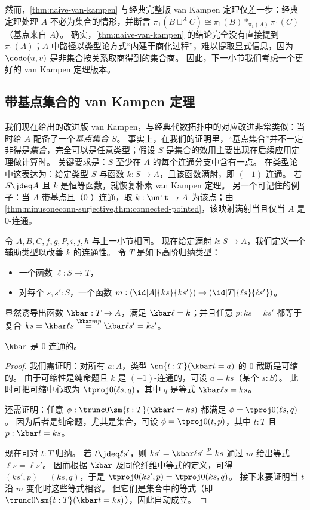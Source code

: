 %

然而，\cref{thm:naive-van-kampen} 与经典完整版 van Kampen 定理仅差一步：经典定理处理 $A$ 不必为集合的情形，并断言 $\pi_1(B\sqcup^A C) \cong \pi_1(B) *_{\pi_1(A)} \pi_1(C)$（基点来自 $A$）。
确实，\cref{thm:naive-van-kampen} 的结论完全没有直接提到 $\pi_1(A)$；$A$ 中路径以类型论方式“内建于商化过程”，难以提取显式信息，因为 $\code(u,v)$ 是非集合按关系取商得到的集合商。
因此，下一小节我们考虑一个更好的 van Kampen 定理版本。


\subsection{带基点集合的 van Kampen 定理}
\label{sec:better-vankampen}

%
我们现在给出的改进版 van Kampen，与经典代数拓扑中的对应改进非常类似：当时给 $A$ 配备了一个\emph{基点集合 $S$}。
事实上，在我们的证明里，“基点集合”并不一定非得是\emph{集合}，完全可以是任意类型；假设 $S$ 是集合的效用主要出现在后续应用定理做计算时。
关键要求是：$S$ 至少在 $A$ 的每个连通分支中含有一点。
在类型论中这表达为：给定类型 $S$ 与函数 $k:S \to A$，且该函数满射，即 $(-1)$-连通。
若 $S\jdeq A$ 且 $k$ 是恒等函数，就恢复朴素 van Kampen 定理。
另一个可记住的例子：当 $A$ 带基点且（0-）连通，取 $k:\unit\to A$ 为该点；由 \cref{thm:minusoneconn-surjective,thm:connected-pointed}，该映射满射当且仅当 $A$ 是 0-连通。

令 $A,B,C,f,g,P,i,j,h$ 与上一小节相同。
现在给定满射 $k:S\to A$，我们定义一个辅助类型以改善 $k$ 的连通性。
令 $T$ 是如下高阶归纳类型：
\begin{itemize}
\item 一个函数 $\ell:S\to T$，
\item 对每个 $s,s':S$，一个函数 $m:(\id[A]{ks}{ks'}) \to (\id[T]{\ell s}{\ell s'})$。
\end{itemize}
显然诱导出函数 $\kbar:T\to A$，满足 $\kbar \ell = k$；并且任意 $p:ks=ks'$ 都等于复合 $ks = \kbar \ell s \overset{\kbar m p}{=} \kbar \ell s' = k s'$。

\begin{lem}\label{thm:kbar}
  $\kbar$ 是 0-连通的。
\end{lem}
\begin{proof}
  我们需证明：对所有 $a:A$，类型 $\sm{t:T}(\kbar t = a)$ 的 0-截断是可缩的。
  由于可缩性是纯命题且 $k$ 是 $(-1)$-连通的，可设 $a=ks$（某个 $s:S$）。
  此时可把可缩中心取为 $\tproj0{(\ell s,q)}$，其中 $q$ 是等式 $\kbar\ell s = k s$。

  还需证明：任意 $\phi:\trunc0{\sm{t:T} (\kbar t = ks)}$ 都满足 $\phi = \tproj0{(\ell s,q)}$。
  因为后者是纯命题，尤其是集合，可设 $\phi=\tproj0{(t,p)}$，其中 $t:T$ 且 $p:\kbar t = ks$。

  现在可对 $t:T$ 归纳。
  若 $t\jdeq\ell s'$，则 $ks' = \kbar \ell s' \overset{p}{=} ks$ 通过 $m$ 给出等式 $\ell s = \ell s'$。
  因而根据 $\kbar$ 及同伦纤维中等式的定义，可得 $(ks',p) = (ks,q)$，于是 $\tproj0{(ks',p)} = \tproj0{(ks,q)}$。
  接下来要证明当 $t$ 沿 $m$ 变化时这些等式相容。
  但它们是集合中的等式（即 $\trunc0{\sm{t:T} (\kbar t = ks)}$），因此自动成立。
\end{proof}

